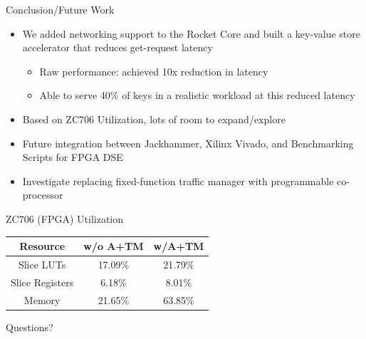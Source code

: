 \documentclass{beamer}
\begin{document}
\begin{frame}{Conclusion/Future Work}
    \begin{itemize}
        \item We added networking support to the Rocket Core and built a key-value store accelerator that reduces get-request latency
            \begin{itemize}
                \item Raw performance: achieved 10x reduction in latency
                \item Able to serve 40\% of keys in a realistic workload at this reduced latency
            \end{itemize}
        \item Based on ZC706 Utilization, lots of room to expand/explore
        \item Future integration between Jackhammer, Xilinx Vivado, and Benchmarking Scripts for FPGA DSE
        \item Investigate replacing fixed-function traffic manager with programmable co-processor 
    \end{itemize}


\begin{center}
    ZC706 (FPGA) Utilization

\vspace{3mm}
\begin{tabular}{ | c | c | c |  } \hline
    Resource        & w/o A+TM & w/A+TM  \\ \hline
    Slice LUTs      & 17.09\%   &  21.79\%   \\  \hline
    Slice Registers & 6.18\%    &  8.01\%    \\  \hline
    Memory          & 21.65\%   &  63.85\%   \\  \hline
\end{tabular}
\end{center}
\end{frame}



\begin{frame}{Questions?}
\end{frame}
\end{document}
